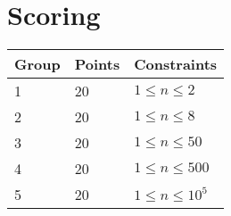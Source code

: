 \section*{Scoring}
\begin{tabular}{|l|l|l|}
\hline
Group & Points & Constraints \\ \hline
1     & 20   & $1 \leq n \leq 2$ \\ \hline
2     & 20   & $1 \leq n \leq 8$ \\ \hline
3     & 20   & $1 \leq n \leq 50$ \\ \hline
4     & 20   & $1 \leq n \leq 500$ \\ \hline
5     & 20   & $1 \leq n \leq 10^5$ \\ \hline
\end{tabular}

